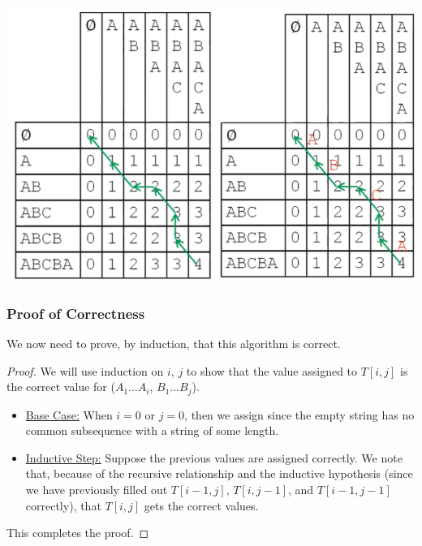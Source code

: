 \documentclass[letterpaper]{article}
\begin{document}
\begin{center}
    \includegraphics[scale=0.7]{../assets/lcss_2.png}
\end{center}


\subsubsection{Proof of Correctness}
We now need to prove, by induction, that this algorithm is correct. 

\begin{mdframed}[]
    \begin{proof}
        We will use induction on $i$, $j$ to show that the value assigned to $T[i, j]$ is the correct value for ($A_1 \dots A_i$, $B_1 \dots B_j$).
        \begin{itemize}
            \item \underline{Base Case:} When $i = 0 $ or $j = 0$, then we assign  since the empty string has no common subsequence with a string of some length. 
            \item \underline{Inductive Step:} Suppose the previous values are assigned correctly. We note that, because of the recursive relationship and the inductive hypothesis (since we have previously filled out $T[i - 1, j]$, $T[i, j - 1]$, and $T[i - 1, j - 1]$ correctly), that $T[i, j]$ gets the correct values. 
        \end{itemize}
        This completes the proof. 
    \end{proof}
\end{mdframed}
\end{document}
